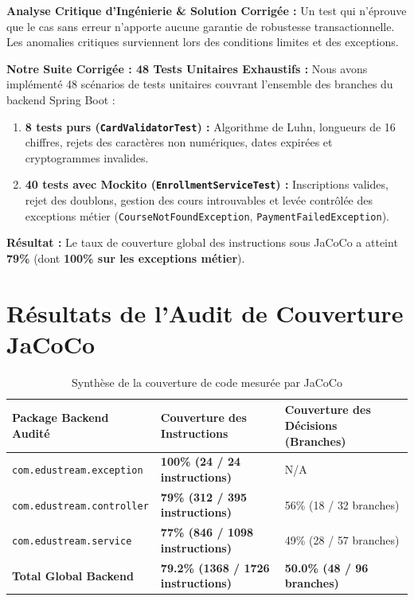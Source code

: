 \documentclass[11pt, a4paper, openany]{report}
\begin{document}
\begin{engSolutionBox}
\textbf{Analyse Critique d'Ingénierie \& Solution Corrigée :}
Un test qui n'éprouve que le cas sans erreur n'apporte aucune garantie de robustesse transactionnelle. Les anomalies critiques surviennent lors des conditions limites et des exceptions.

\textbf{Notre Suite Corrigée : 48 Tests Unitaires Exhaustifs :}
Nous avons implémenté 48 scénarios de tests unitaires couvrant l'ensemble des branches du backend Spring Boot :
\begin{enumerate}[noitemsep]
    \item \textbf{8 tests purs (\texttt{CardValidatorTest}) :} Algorithme de Luhn, longueurs de 16 chiffres, rejets des caractères non numériques, dates expirées et cryptogrammes invalides.
    \item \textbf{40 tests avec Mockito (\texttt{EnrollmentServiceTest}) :} Inscriptions valides, rejet des doublons, gestion des cours introuvables et levée contrôlée des exceptions métier (\texttt{CourseNotFoundException}, \texttt{PaymentFailedException}).
\end{enumerate}
\textbf{Résultat :} Le taux de couverture global des instructions sous JaCoCo a atteint \textbf{79\%} (dont \textbf{100\% sur les exceptions métier}).
\end{engSolutionBox}

\section{Résultats de l'Audit de Couverture JaCoCo}

\begin{table}[h]
\centering
\renewcommand{\arraystretch}{1.2}
\begin{tabularx}{\textwidth}{|l|X|X|}
\hline
\rowcolor{primary!20}
\textbf{Package Backend Audité} & \textbf{Couverture des Instructions} & \textbf{Couverture des Décisions (Branches)} \\ \hline
\texttt{com.edustream.exception} & \textbf{\color{success}100\% (24 / 24 instructions)} & N/A \\ \hline
\texttt{com.edustream.controller} & \textbf{79\% (312 / 395 instructions)} & 56\% (18 / 32 branches) \\ \hline
\texttt{com.edustream.service} & \textbf{77\% (846 / 1098 instructions)} & 49\% (28 / 57 branches) \\ \hline
\textbf{Total Global Backend} & \textbf{79.2\% (1368 / 1726 instructions)} & \textbf{50.0\% (48 / 96 branches)} \\ \hline
\end{tabularx}
\caption{Synthèse de la couverture de code mesurée par JaCoCo}
\end{table}
\end{document}
